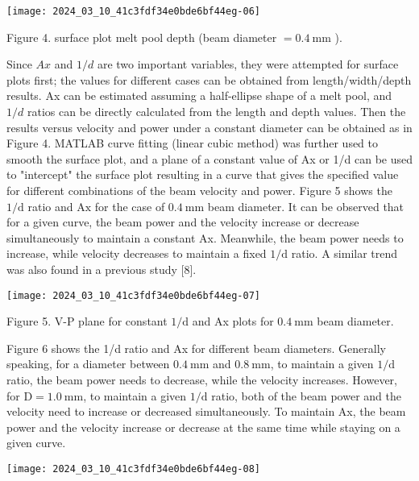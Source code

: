 \documentclass[10pt]{article}
\begin{document}
\begin{center}
\texttt{[image: 2024\_03\_10\_41c3fdf34e0bde6bf44eg-06]}
\end{center}

Figure 4. surface plot melt pool depth (beam diameter $=0.4 \mathrm{~mm}$ ).

Since $A x$ and $1 / d$ are two important variables, they were attempted for surface plots first; the values for different cases can be obtained from length/width/depth results. Ax can be estimated assuming a half-ellipse shape of a melt pool, and $1 / d$ ratios can be directly calculated from the length and depth values. Then the results versus velocity and power under a constant diameter can be obtained as in Figure 4. MATLAB curve fitting (linear cubic method) was further used to smooth the surface plot, and a plane of a constant value of Ax or 1/d can be used to "intercept" the surface plot resulting in a curve that gives the specified value for different combinations of the beam velocity and power. Figure 5 shows the $1 / \mathrm{d}$ ratio and $\mathrm{Ax}$ for the case of $0.4 \mathrm{~mm}$ beam diameter. It can be observed that for a given curve, the beam power and the velocity increase or decrease simultaneously to maintain a constant Ax. Meanwhile, the beam power needs to increase, while velocity decreases to maintain a fixed $1 / \mathrm{d}$ ratio. A similar trend was also found in a previous study [8].

\begin{center}
\texttt{[image: 2024\_03\_10\_41c3fdf34e0bde6bf44eg-07]}
\end{center}

Figure 5. V-P plane for constant $1 / \mathrm{d}$ and Ax plots for $0.4 \mathrm{~mm}$ beam diameter.

Figure 6 shows the 1/d ratio and Ax for different beam diameters. Generally speaking, for a diameter between $0.4 \mathrm{~mm}$ and $0.8 \mathrm{~mm}$, to maintain a given $1 / \mathrm{d}$ ratio, the beam power needs to decrease, while the velocity increases. However, for $\mathrm{D}=1.0 \mathrm{~mm}$, to maintain a given $1 / \mathrm{d}$ ratio, both of the beam power and the velocity need to increase or decreased simultaneously. To maintain Ax, the beam power and the velocity increase or decrease at the same time while staying on a given curve.

\begin{center}
\texttt{[image: 2024\_03\_10\_41c3fdf34e0bde6bf44eg-08]}
\end{center}
\end{document}
